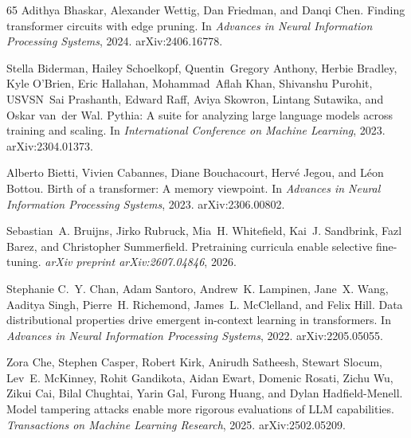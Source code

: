 \begin{thebibliography}{65}
Adithya Bhaskar, Alexander Wettig, Dan Friedman, and Danqi Chen.
\newblock Finding transformer circuits with edge pruning.
\newblock In \emph{Advances in Neural Information Processing Systems}, 2024.
\newblock arXiv:2406.16778.

Stella Biderman, Hailey Schoelkopf, Quentin~Gregory Anthony, Herbie Bradley, Kyle
  O'Brien, Eric Hallahan, Mohammad~Aflah Khan, Shivanshu Purohit, USVSN~Sai
  Prashanth, Edward Raff, Aviya Skowron, Lintang Sutawika, and Oskar van~der Wal.
\newblock Pythia: A suite for analyzing large language models across training
  and scaling.
\newblock In \emph{International Conference on Machine Learning}, 2023.
\newblock arXiv:2304.01373.

Alberto Bietti, Vivien Cabannes, Diane Bouchacourt, Herv{\'e} Jegou, and
  L{\'e}on Bottou.
\newblock Birth of a transformer: A memory viewpoint.
\newblock In \emph{Advances in Neural Information Processing Systems}, 2023.
\newblock arXiv:2306.00802.

Sebastian~A. Bruijns, Jirko Rubruck, Mia~H. Whitefield, Kai~J. Sandbrink, Fazl Barez, and Christopher Summerfield.
\newblock Pretraining curricula enable selective fine-tuning.
\newblock \emph{arXiv preprint arXiv:2607.04846}, 2026.

Stephanie C.~Y. Chan, Adam Santoro, Andrew~K. Lampinen, Jane~X. Wang, Aaditya
  Singh, Pierre~H. Richemond, James~L. McClelland, and Felix Hill.
\newblock Data distributional properties drive emergent in-context learning in
  transformers.
\newblock In \emph{Advances in Neural Information Processing Systems}, 2022.
\newblock arXiv:2205.05055.

Zora Che, Stephen Casper, Robert Kirk, Anirudh Satheesh, Stewart Slocum, Lev~E. McKinney, Rohit Gandikota, Aidan Ewart, Domenic Rosati, Zichu Wu, Zikui Cai, Bilal Chughtai, Yarin Gal, Furong Huang, and Dylan Hadfield-Menell.
\newblock Model tampering attacks enable more rigorous evaluations of LLM capabilities.
\newblock \emph{Transactions on Machine Learning Research}, 2025.
\newblock arXiv:2502.05209.


\end{thebibliography}
